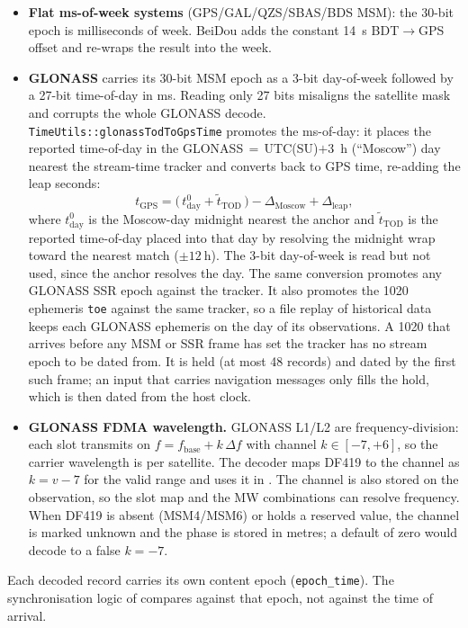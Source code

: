 \documentclass[main.tex]{subfiles}
\begin{document}
\begin{itemize}[leftmargin=*, itemsep=0pt]
\item \textbf{Flat ms-of-week systems} (GPS/GAL/QZS/SBAS/BDS MSM):
      the 30-bit epoch is milliseconds of week.  BeiDou adds the
      constant \SI{14}{\second} BDT$\to$GPS offset and re-wraps the
      result into the week.
\item \textbf{GLONASS} carries its 30-bit MSM epoch as a 3-bit
      day-of-week followed by a 27-bit time-of-day in ms.  Reading only
      27 bits misaligns the satellite mask and corrupts the whole
      GLONASS decode.  \texttt{TimeUtils::glonassTodToGpsTime} promotes
      the ms-of-day: it places the reported time-of-day in the
      GLONASS\,$=$\,UTC(SU)$+$\SI{3}{\hour} (``Moscow'') day nearest the
      stream-time tracker and converts back to GPS time, re-adding the
      leap seconds:
\begin{equation}
t_{\text{GPS}} =
  \big(\,t_{\text{day}}^{0} + \tilde{t}_{\text{TOD}}\,\big)
  - \Delta_{\text{Moscow}} + \Delta_{\text{leap}},
\label{eq:rt-glo-time}
\end{equation}
      where $t_{\text{day}}^{0}$ is the Moscow-day midnight nearest the
      anchor and $\tilde{t}_{\text{TOD}}$ is the reported time-of-day
      placed into that day by resolving the midnight wrap toward the
      nearest match ($\pm\SI{12}{\hour}$).  The 3-bit day-of-week is
      read but not used, since the anchor resolves the day.  The same
      conversion promotes any GLONASS SSR epoch against the tracker.  It
      also promotes the 1020 ephemeris \texttt{toe} against the same
      tracker, so a file replay of historical data keeps each GLONASS
      ephemeris on the day of its observations.  A 1020 that arrives
      before any MSM or SSR frame has set the tracker has no stream
      epoch to be dated from.  It is held (at most 48 records) and dated
      by the first such frame; an input that carries navigation messages
      only fills the hold, which is then dated from the host clock.
\item \textbf{GLONASS FDMA wavelength.}  GLONASS L1/L2 are
      frequency-division: each slot transmits on
      $f = f_{\text{base}} + k\,\Delta f$ with channel
      $k \in [-7,+6]$, so the carrier wavelength is per satellite.  The
      decoder maps DF419 to the channel as $k = v - 7$ for the valid
      range and uses it in .  The channel is also
      stored on the observation, so the slot map and the MW combinations
      can resolve frequency.  When DF419 is absent (MSM4/MSM6) or holds a
      reserved value, the channel is marked unknown and the phase is
      stored in metres; a default of zero would decode to a false
      $k=-7$.
\end{itemize}
Each decoded record carries its own content epoch
(\texttt{epoch\_time}).  The synchronisation logic of
 compares against that epoch, not against the time of
arrival.
\end{document}
